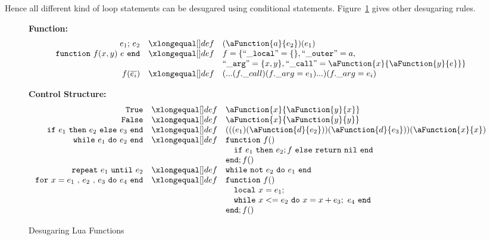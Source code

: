 Hence all different kind of loop statements can be desugared using conditional statements. Figure~\ref{fig:desLuaFunc} gives other desugaring rules.

\begin{figure}
\caption{Desugaring Lua Functions}\label{fig:desLuaFunc}
{\bf Function:}\[
\begin{array}{rclcl}
\desugar{e_1{\tt ;}~e_2}{(\aFunction{a}{e_2})(e_1)}
\desugar{{\tt function}~f(x,y)~e~{\tt end}}{f = \{ {\tt ``\_local"} = \{\}, {\tt ``\_outer"} = a,}
\desugarline{{\tt ``\_arg"} = \{x, y\}, {\tt ``\_call"} = \aFunction{x}{\aFunction{y}{e}}\}}
\desugar{f(\overline{e_i})}{(...(f.\_call)(f.\_arg = e_1)...)(f.\_arg = e_i)}
\end{array}\]

{\bf Control Structure:}\[
\begin{array}{rclcl}

\desugar{\tt True}{\aFunction{x}{\aFunction{y}{x}}}
\desugar{\tt False}{\aFunction{x}{\aFunction{y}{y}}}
\desugar{
    {\tt if}~e_1~{\tt then}~e_2~{\tt else}~e_3~{\tt end}
}{
    (((e_1)(\aFunction{d}{e_2}))(\aFunction{d}{e_3}))(\aFunction{x}{x})
}
\desugar{{\tt while}~e_1~{\tt do}~e_2~{\tt end}}{
    {\tt function}~f()
}
\desugarline{ \quad{\tt if}~e_1~{\tt then}~e_2;f~{\tt else}~{\tt return}~{\tt nil}~{\tt end}\\
{\tt end};f()
}
\desugar{{\tt repeat}~e_1~{\tt until}~e_2}{
   {\tt while}~{\tt not}~e_2~{\tt do}~e_1~{\tt end}\\
}
\desugar{{\tt for}~x=e_1~{\tt ,}~e_2~{\tt ,}~e_3~{\tt do}~e_4~{\tt end}}{
    {\tt function}~f()
}
\desugarline{
    \quad {\tt local}~x = e_1;\\
    \quad {\tt while}~x<= e_2~{\tt do}~x = x + e_3;~e_4~{\tt end}\\
    {\tt end};f()\\
}
\end{array}\]
\end{figure}
